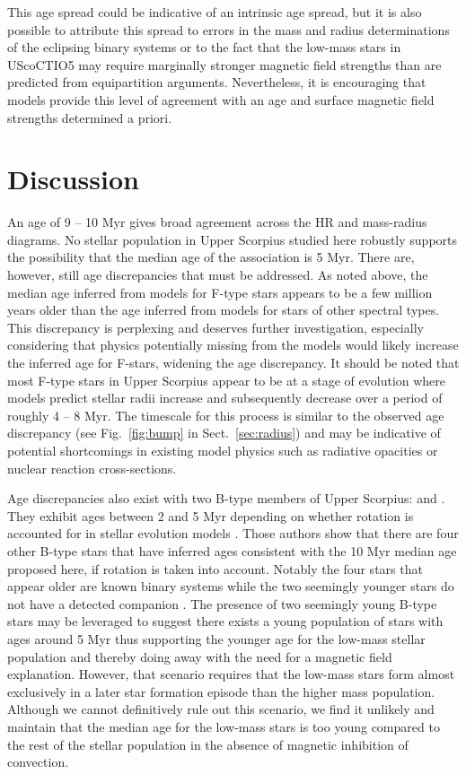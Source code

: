 \documentclass{aa}
\begin{document}
This age spread could be indicative of an intrinsic age spread, but it is also possible to attribute this spread to errors in the mass and radius determinations of the eclipsing binary systems or to the fact that the low-mass stars in UScoCTIO5 may require marginally stronger magnetic field strengths than are predicted from equipartition arguments. Nevertheless, it is encouraging that models provide this level of agreement with an age and surface magnetic field strengths determined a priori. 

\section{Discussion}
\label{sec:disc}
An age of 9 -- 10 Myr gives broad agreement across the HR and mass-radius diagrams. No stellar population in Upper Scorpius studied here robustly supports the possibility that the median age of the association is 5 Myr. There are, however, still age discrepancies that must be addressed. As noted above, the median age inferred from models for F-type stars appears to be a few million years older than the age inferred from models for stars of other spectral types. This discrepancy is perplexing and deserves further investigation, especially considering that physics potentially missing from the models would likely increase the inferred age for F-stars, widening the age discrepancy. It should be noted that most F-type stars in Upper Scorpius appear to be at a stage of evolution where models predict stellar radii increase and subsequently decrease over a period of roughly 4 -- 8 Myr. The timescale for this process is similar to the observed age discrepancy (see Fig.~\ref{fig:bump} in Sect.~\ref{sec:radius}) and may be indicative of potential shortcomings in existing model physics such as radiative opacities or nuclear reaction cross-sections. 

Age discrepancies also exist with two B-type members of Upper Scorpius:  and . They exhibit ages between 2 and 5 Myr depending on whether rotation is accounted for in stellar evolution models \citep{Pecaut2012}. Those authors show that there are four other B-type stars that have inferred ages consistent with the 10 Myr median age proposed here, if rotation is taken into account. Notably the four stars that appear older are known binary systems while the two seemingly younger stars do not have a detected companion \citep{Pecaut2012}. The presence of two seemingly young B-type stars may be leveraged to suggest there exists a young population of stars with ages around 5 Myr thus supporting the younger age for the low-mass stellar population and thereby doing away with the need for a magnetic field explanation. However, that scenario requires that the low-mass stars form almost exclusively in a later star formation episode than the higher mass population. Although we cannot definitively rule out this scenario, we find it unlikely and maintain that the median age for the low-mass stars is too young compared to the rest of the stellar population in the absence of magnetic inhibition of convection.
\end{document}
